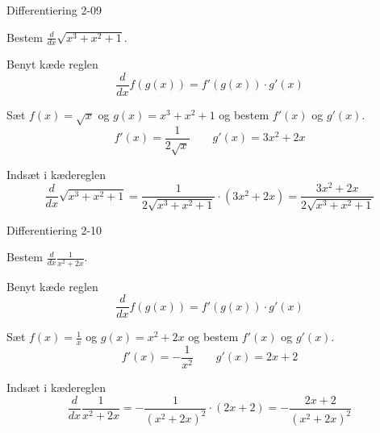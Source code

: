 \documentclass{article}
\begin{document}
\begin{exercise}{Differentiering 2-09}

Bestem $\frac{d}{dx} \sqrt{x^3 + x^2 + 1}$.


\hint
Benyt kæde reglen
\[
\frac{d}{dx} f(g(x)) = f'(g(x)) \cdot g'(x)
\]

\hint
Sæt $f(x) = \sqrt{x}$ og $g(x) = x^3 + x^2 + 1 $ og bestem $f'(x)$ og $g'(x)$.
\[
f'(x) = \frac{1}{2\sqrt{x}} \qquad g'(x) = 3x^2 + 2x
\]

\hint
Indsæt i kædereglen
\[
\frac{d}{dx} \sqrt{x^3 + x^2 + 1} = \frac{1}{2 \sqrt{x^3 + x^2 + 1}} \cdot (3x^2 + 2x) = \frac{3x^2 + 2x}{2 \sqrt{x^3 + x^2 + 1}}
\]

\end{exercise}

\begin{exercise}{Differentiering 2-10}

Bestem $\frac{d}{dx} \frac{1}{x^2 + 2x}$.


\hint
Benyt kæde reglen
\[
\frac{d}{dx} f(g(x)) = f'(g(x)) \cdot g'(x)
\]

\hint
Sæt $f(x) = \frac{1}{x}$ og $g(x) = x^2 + 2x$ og bestem $f'(x)$ og $g'(x)$.
\[
f'(x) = - \frac{1}{x^2} \qquad g'(x) = 2x + 2
\]

\hint
Indsæt i kædereglen
\[
\frac{d}{dx} \frac{1}{x^2 + 2x} = - \frac{1}{(x^2 + 2x)^2} \cdot (2x + 2 ) = - \frac{2x + 2}{(x^2 + 2x)^2}
\]

\end{exercise}
\end{document}

